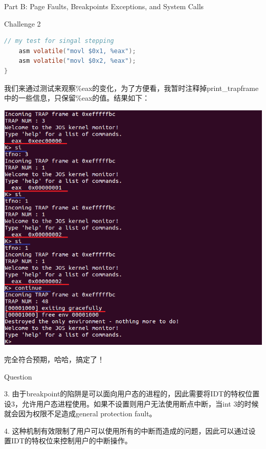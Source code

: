 \documentclass[GBK,winfonts,a4paper,10pt]{ctexart}
\begin{document}
\begin{section}{ Part B: Page Faults, Breakpoints Exceptions, and System Calls }
\begin{subsection}{ Challenge 2 }
\begin{lstlisting}[language=C]
 	// my test for singal stepping
 	asm volatile("movl $0x1, %eax");
 	asm volatile("movl $0x2, %eax");
}
\end{lstlisting}
\par
我们来通过测试来观察\%eax的变化，为了方便看，我暂时注释掉print\_trapframe中的一些信息，只保留\%eax的值。结果如下：
\par
\includegraphics[scale=0.5]{step.png}
\par
完全符合预期，哈哈，搞定了！
\end{subsection}

\begin{subsection}{ Question }
\par
3. 由于breakpoint的陷阱是可以面向用户态的进程的，因此需要将IDT的特权位置设3，允许用户态进程使用。如果不设置则用户无法使用断点中断，当int 3的时候就会因为权限不足造成general protection fault。
\par
4. 这种机制有效限制了用户可以使用所有的中断而造成的问题，因此可以通过设置IDT的特权位来控制用户的中断操作。
\end{subsection}


\end{section}
\end{document}
